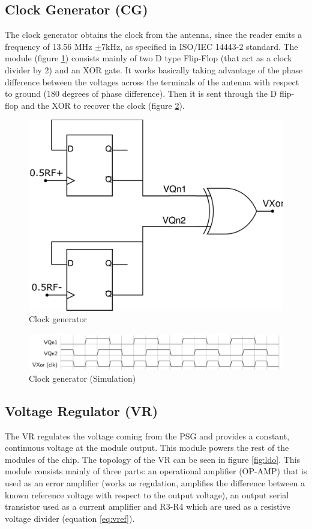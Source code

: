 \documentclass[a4paper, 10pt, conference]{ieeeconf}      %
\begin{document}
\subsection{Clock Generator (CG)}
The clock generator obtains the clock from the antenna, since the reader emits a frequency of 13.56 MHz $\pm$7kHz, as specified in ISO/IEC 14443-2 standard. The module (figure  \ref{fig:clock_gen}) consists mainly of two D type Flip-Flop (that act as a clock divider by 2) and an XOR gate.
It works basically taking advantage of the phase difference between the voltages across the terminals of the antenna with respect to ground (180 degrees of phase difference). Then it is sent through the D flip-flop and the XOR to recover the clock (figure 
\ref{fig:clock_gen_sim}).
\begin{figure}[H]
\centering
\includegraphics[width=0.5\linewidth]{Images/ImagenesTesina/circuitos/CLK.png}
\caption{Clock generator}
\label{fig:clock_gen}
\end{figure}

\begin{figure}[H]
\centering
\includegraphics[width=0.9\linewidth]{Images/ImagenesTesina/circuitos/clk_sim.png}
\caption{Clock generator (Simulation)}
\label{fig:clock_gen_sim}
\end{figure}

\subsection{Voltage Regulator (VR)}
The VR regulates the voltage coming from the PSG and provides a constant, continuous voltage at the module output. This module powers the rest of the modules of the chip. The topology of the VR can be seen in figure \ref{fig:ldo}. This module consists mainly of three parts: an operational amplifier (OP-AMP) that is used as an error amplifier (works as regulation, amplifies the difference between a known reference voltage with respect to the output voltage), an output serial transistor used as a current amplifier and R3-R4 which are used as a resistive voltage divider (equation \ref{eq:vref}).  
\end{document}
